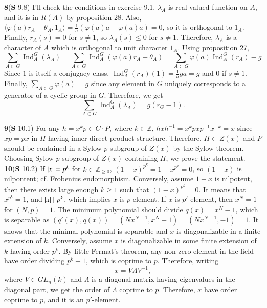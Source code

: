 \documentclass[a4paper, 12pt]{article}
\theoremstyle{Mydefinition}
\theoremstyle{Mytheorem}
\DeclareMathOperator{\Ind}{Ind}
\begin{document}
\noindent \textbf{8}(\textbf{S} 9.8)
I'll check the conditions in exercise 9.1. $\lambda_A$ is real-valued function on $A$, and it is in $R(A)$ by proposition 28. Also, $\langle \varphi(a)r_A - \theta_A, 1_A\rangle = \frac{1}{a}(\varphi(a)a - \varphi(a)a) = 0$, so it is orthogonal to $1_A$. Finally, $r_A(s)=0$ for $s\neq 1$, so $\lambda_A(s)\leq 0$ for $s\neq 1$. Therefore, $\lambda_A$ is a character of $A$ which is orthogonal to unit character $1_A$. Using proposition 27,
\begin{equation}
    \sum_{A\subset G}\Ind_A^G(\lambda_A) = \sum_{A\subset G}\Ind_A^G(\varphi(a)r_A - \theta_A) = \sum_{A\subset G}\varphi(a)\Ind_A^G(r_A) - g
\end{equation}
Since $1$ is itself a conjugacy class, $\Ind_A^G(r_A)(1) = \frac{1}{a}ga = g$ and $0$ if $s\neq 1$. Finally, $\sum_{A\subset G}\varphi(a) = g$ since any element in $G$ uniquely corresponds to a generator of a cyclic group in $G$. Therefore, we get
\begin{equation}
    \sum_{A\subset G}\Ind_A^G(\lambda_A) = g(r_G-1).
\end{equation}
 
\noindent \textbf{9}(\textbf{S} 10.1)
For any $h = x^k p\in C\cdot P$, where $k\in\mathbb{Z}$, $hxh^{-1} = x^kpxp^{-1}x^{-k} = x$ since $xp=px$ in $H$ having inner direct product structure. Therefore, $H\subset Z(x)$ and $P$ should be contained in a Sylow $p$-subgroup of $Z(x)$ by the Sylow theorem. Choosing Sylow $p$-subgroup of $Z(x)$ containing $H$, we prove the statement.\\

\noindent \textbf{10}(\textbf{S} 10.2)
If $\abs{x} = p^k$ for $k\in\mathbb{Z}_{\geq 0}$, $(1-x)^{p^k} = 1-x^{p^k} = 0$, so $(1-x)$ is nilpontent; cf. Frobenius endomorphism. Conversely, assume $1-x$ is nilpotent, then there exists large enough $k\geq 1$ such that $(1-x)^{p^k} = 0$. It means that $x^{p^k} = 1$, and $\abs{x}\mid p^k$, which implies $x$ is $p$-element.
If $x$ is $p'$-element, then $x^N = 1$ for $(N, p)=1$. The minimum polynomial should divide $q(x) = x^N-1$, which is separable as $(q'(x), q(x)) = (Nx^{N-1}, x^N-1) = (Nx^{N-1}, -1) = 1$. It shows that the minimal polynomial is separable and $x$ is diagonalizable in a finite extension of $k$. Conversely, assume $x$ is diagonalizable in some finite extension of $k$ having order $p^k$. By little Fermat's theorem, any non-zero element in the field have order dividing $p^k-1$, which is coprime to $p$. Therefore, writing
\begin{equation}
    x = V\Lambda V^{-1},
\end{equation}
where $V\in GL_n(k)$ and $\Lambda$ is a diagonal matrix having eigenvalues in the diagonal part, we get the order of $\Lambda$ coprime to $p$. Therefore, $x$ have order coprime to $p$, and it is an $p'$-element.
\end{document}
